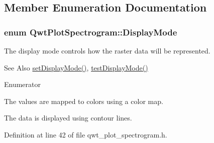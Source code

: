 \subsection{Member Enumeration Documentation}
\hypertarget{class_qwt_plot_spectrogram_a7f4904fe68b442d0f93040ea1fa1d062}{
\subsubsection[{Display\-Mode}]{\setlength{\rightskip}{0pt plus 5cm}enum {\bf Qwt\-Plot\-Spectrogram\-::\-Display\-Mode}}}\label{class_qwt_plot_spectrogram_a7f4904fe68b442d0f93040ea1fa1d062}
The display mode controls how the raster data will be represented. \begin{DoxySeeAlso}{See Also}
\hyperlink{class_qwt_plot_spectrogram_a482a82bcf1b9f2a9a75f527063b394a2}{set\-Display\-Mode()}, \hyperlink{class_qwt_plot_spectrogram_a292ec25eb59adaedf90eef45e98f4d38}{test\-Display\-Mode()} 
\end{DoxySeeAlso}
\begin{Desc}
\item[Enumerator]\par
\begin{description}
\item[{\em 
\hypertarget{class_qwt_plot_spectrogram_a7f4904fe68b442d0f93040ea1fa1d062ac9696cad413e4a11a4721779728fb9e3}{Image\-Mode}\label{class_qwt_plot_spectrogram_a7f4904fe68b442d0f93040ea1fa1d062ac9696cad413e4a11a4721779728fb9e3}
}]The values are mapped to colors using a color map. \item[{\em 
\hypertarget{class_qwt_plot_spectrogram_a7f4904fe68b442d0f93040ea1fa1d062a64e86465a6d48ad80c4baadb144f9cf8}{Contour\-Mode}\label{class_qwt_plot_spectrogram_a7f4904fe68b442d0f93040ea1fa1d062a64e86465a6d48ad80c4baadb144f9cf8}
}]The data is displayed using contour lines. \end{description}
\end{Desc}


Definition at line 42 of file qwt\-\_\-plot\-\_\-spectrogram.\-h.



